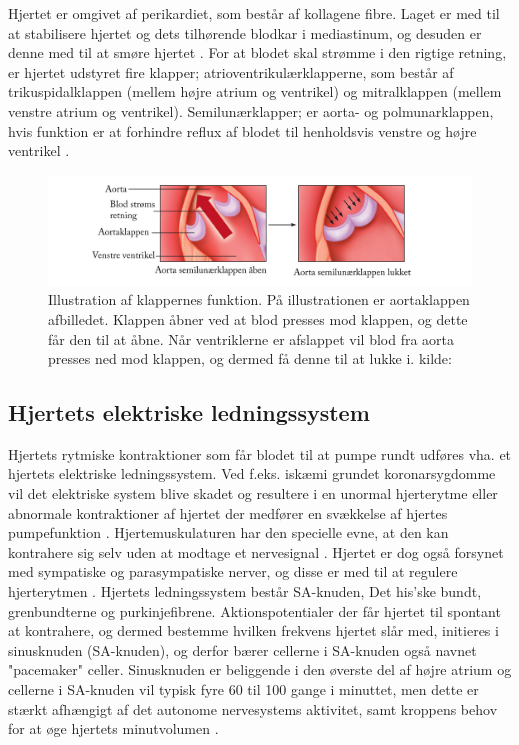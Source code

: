 Hjertet er omgivet af perikardiet, som består af kollagene fibre. Laget er med til at stabilisere hjertet og dets tilhørende blodkar i mediastinum, og desuden er denne med til at smøre hjertet . For at blodet skal strømme i den rigtige retning, er hjertet udstyret fire klapper; atrioventrikulærklapperne, som består af trikuspidalklappen (mellem højre atrium og  ventrikel) og mitralklappen (mellem venstre atrium og ventrikel). Semilunærklapper; er aorta- og polmunarklappen, hvis funktion er at forhindre reflux af blodet til henholdsvis venstre og højre ventrikel \cite{gronanatomi}.  

\begin{figure}[H]
\includegraphics[scale=0.7]{figures/cusp}
\caption{ Illustration af klappernes funktion. På illustrationen er aortaklappen afbilledet. Klappen åbner ved at blod presses mod klappen, og dette får den til at åbne. Når ventriklerne er afslappet vil blod fra aorta presses ned mod klappen, og dermed få denne til at lukke i. kilde: \cite{cindy}}
\end{figure}

\subsection{Hjertets elektriske ledningssystem}\label{Hjertets_elektriske_ledningssystem}
Hjertets rytmiske kontraktioner som får blodet til at pumpe rundt udføres vha. et hjertets elektriske ledningssystem. Ved f.eks. iskæmi grundet koronarsygdomme vil det elektriske system blive skadet og resultere i en unormal hjerterytme eller abnormale kontraktioner af hjertet der medfører en svækkelse af hjertes pumpefunktion \cite{guyton}. Hjertemuskulaturen har den specielle evne, at den kan kontrahere sig selv uden at modtage et nervesignal \cite{gronanatomi}. Hjertet er dog også forsynet med sympatiske og parasympatiske nerver, og disse er med til at regulere hjerterytmen \cite{cindy}. 
Hjertets ledningssystem består SA-knuden, Det his'ske bundt, grenbundterne og purkinjefibrene.
Aktionspotentialer der får hjertet til spontant at kontrahere, og dermed bestemme hvilken frekvens hjertet slår med, initieres i sinusknuden (SA-knuden), og derfor bærer cellerne i SA-knuden også navnet "pacemaker" celler.
Sinusknuden er beliggende i den øverste del af højre atrium og cellerne i SA-knuden vil typisk fyre 60 til 100 gange i minuttet, men dette er stærkt afhængigt af det autonome nervesystems aktivitet, samt kroppens behov for at øge hjertets
minutvolumen \cite{ekgbook}.

